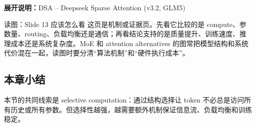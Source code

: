 \noindent\textbf{展开说明：}DSA – Deepseek Sparse Attention (v3.2, GLM5)

\begin{knowledgebox}{读图：Slide 13 应该怎么看}
这页是机制或证据页。先看它比较的是 compute、参数量、routing、负载均衡还是通信；再看结论支持的是质量提升、训练速度、推理成本还是系统复杂度。MoE 和 attention alternatives 的图常把模型结构和系统代价混在一起，读图时要分清“算法机制”和“硬件执行成本”。
\end{knowledgebox}

\subsection{本章小结}
本节的共同线索是 selective computation：通过结构选择让 token 不必总是访问所有历史或所有参数。但选择性越强，越需要额外机制保证信息流、负载均衡和训练稳定。

